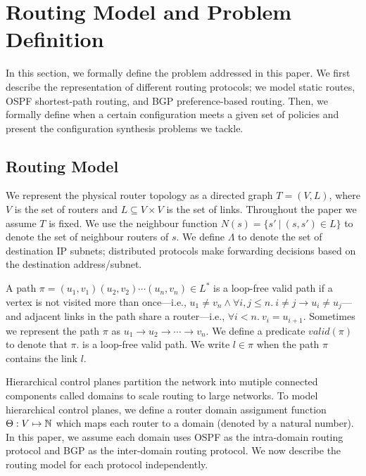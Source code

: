 

\section{Routing Model and Problem Definition}
In this section, we formally define the problem addressed in this
paper.  We first describe the representation of different
routing protocols; we model static
routes, OSPF shortest-path routing, and BGP preference-based routing.
Then, we formally define when a certain configuration meets a given
set of policies and present the configuration synthesis problems
we tackle.

\subsection{Routing Model}

We represent the physical router topology as a directed graph $T=(V, L)$,
where $V$ is the set of routers and $L\subseteq V\times V$ is the set of links. 
Throughout the paper we assume $T$ is fixed.
We use the neighbour function $N(s) = \{s'\ | \ (s,s') \in L \}$ to denote 
the set of neighbour routers of $s$. 
We define $\Lambda$ to denote the set of destination IP subnets;
distributed protocols make forwarding decisions based on the 
destination address/subnet.

A path $\pi = (u_1,v_1) (u_2, v_2) \cdots (u_n, v_n) \in L^*$ is a loop-free valid path if
a  vertex is not visited more than once---i.e.,
$u_1\neq v_n\wedge\forall i,j \leq n. 
~i \not= j \rightarrow u_i \not= u_j$---and adjacent links in the
path share a router---i.e., $\forall i < n. ~v_i = u_{i+1}$.
Sometimes we represent the path $\pi$ as $u_1\rightarrow u_2 \rightarrow  \cdots \rightarrow v_n$.
We define a predicate $valid(\pi)$ to denote that $\pi$. 
is a loop-free valid path. 
We write $l \in \pi$ when the path $\pi$ contains the link $l$. 

Hierarchical control planes partition the
network into mutiple connected components called domains 
to scale routing to large networks. To model hierarchical 
control planes, 
we define a router domain assignment function
$\Theta: V \mapsto \mathbb{N}$ which maps each router to a domain 
(denoted by a natural number). In this paper, we assume 
each domain uses OSPF as the intra-domain routing protocol
and BGP as the inter-domain routing protocol. We now describe
the routing model for each protocol independently. 



